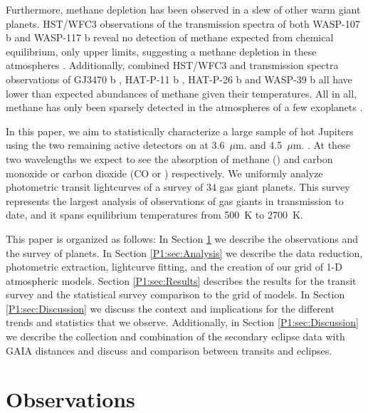 Furthermore, methane depletion has been observed in a slew of other warm giant planets. HST/WFC3 observations of the transmission spectra of both WASP-107 b and WASP-117 b reveal no detection of methane expected from chemical equilibrium, only upper limits, suggesting a methane depletion in these atmospheres \citep{Kreidberg2018a, Spake2018, Carone2021}. Additionally, combined HST/WFC3 and \spitzerIRAC transmission spectra observations of GJ3470 b \citep{Benneke2019}, HAT-P-11 b \citep{Chachan2019}, HAT-P-26 b \citep{Wakeford2017} and WASP-39 b \citep{Wakeford2018} all have lower than expected abundances of methane given their temperatures. All in all, methane has only been sparsely detected in the atmospheres of a few exoplanets \citep{Swain2008,Tinetti2010,Guilluy2019}.

In this paper, we aim to statistically characterize a large sample of hot Jupiters using the two remaining active detectors on \spitzerIRAC at 3.6~$\mu$m. and 4.5~$\mu$m. \citep{Fazio2004, Werner2004}. At these two wavelengths we expect to see the absorption of methane () and carbon monoxide or carbon dioxide (CO or ) respectively. We uniformly analyze \spitzerIRAC photometric transit lightcurves of a survey of 34 gas giant planets. This survey represents the largest analysis of \spitzerIRAC observations of gas giants in transmission to date, and it spans equilibrium temperatures from 500~K to 2700~K.

This paper is organized as follows: In Section \ref{P1:sec:observations} we describe the observations and the survey of planets. In Section \ref{P1:sec:Analysis} we describe the data reduction, photometric extraction, lightcurve fitting, and the creation of our grid of 1-D atmospheric models. Section \ref{P1:sec:Results} describes the results for the transit survey and the statistical survey comparison to the grid of models. In Section \ref{P1:sec:Discussion} we discuss the context and implications for the different trends and statistics that we observe. Additionally, in Section \ref{P1:sec:Discussion} we describe the collection and combination of the secondary eclipse data with GAIA distances and discuss and comparison between transits and eclipses.

\section{Observations}

\label{P1:sec:observations}


